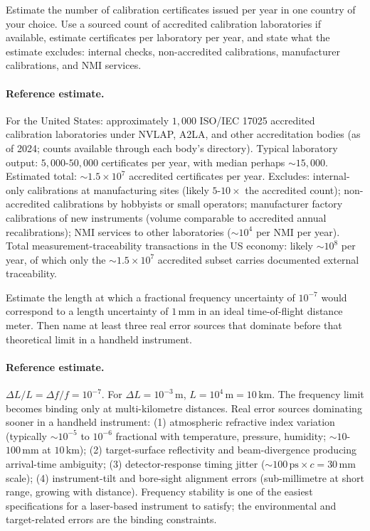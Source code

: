 \begin{exercise}
Estimate the number of calibration certificates issued per year in
one country of your choice. Use a sourced count of accredited
calibration laboratories if available, estimate certificates per
laboratory per year, and state what the estimate excludes:
internal checks, non-accredited calibrations, manufacturer
calibrations, and NMI services.

\paragraph{Reference estimate.}
For the United States: approximately $1{,}000$ ISO/IEC 17025
accredited calibration laboratories under NVLAP, A2LA, and other
accreditation bodies (as of 2024; counts available through each
body's directory). Typical laboratory output: $5{,}000$-$50{,}000$
certificates per year, with median perhaps $\sim 15{,}000$. Estimated
total: $\sim 1.5 \times 10^7$ accredited certificates per year.
Excludes: internal-only calibrations at manufacturing sites (likely
$5$-$10\times$ the accredited count); non-accredited calibrations
by hobbyists or small operators; manufacturer factory calibrations
of new instruments (volume comparable to accredited annual
recalibrations); NMI services to other laboratories ($\sim 10^{4}$
per NMI per year). Total measurement-traceability transactions in
the US economy: likely $\sim 10^{8}$ per year, of which only the
$\sim 1.5 \times 10^7$ accredited subset carries documented
external traceability.
\end{exercise}

\begin{exercise}
Estimate the length at which a fractional frequency uncertainty of
$10^{-7}$ would correspond to a length uncertainty of
$1 \,\si{\milli\meter}$ in an ideal time-of-flight distance meter.
Then name at least three real error sources that dominate before
that theoretical limit in a handheld instrument.

\paragraph{Reference estimate.}
$\Delta L / L = \Delta f / f = 10^{-7}$. For $\Delta L = 10^{-3}
\,\si{\meter}$, $L = 10^{4} \,\si{\meter} = 10 \,\si{\kilo\meter}$.
The frequency limit becomes binding only at multi-kilometre
distances. Real error sources dominating sooner in a handheld
instrument: (1) atmospheric refractive index variation (typically
$\sim 10^{-5}$ to $10^{-6}$ fractional with temperature, pressure,
humidity; $\sim 10$-$100\,\si{\milli\meter}$ at $10 \,\si{\kilo
\meter}$); (2) target-surface reflectivity and beam-divergence
producing arrival-time ambiguity; (3) detector-response timing
jitter ($\sim 100 \,\si{\pico\second} \times c = 30 \,\si{\milli
\meter}$ scale); (4) instrument-tilt and bore-sight alignment
errors (sub-millimetre at short range, growing with distance).
Frequency stability is one of the easiest specifications for a
laser-based instrument to satisfy; the environmental and
target-related errors are the binding constraints.
\end{exercise}

